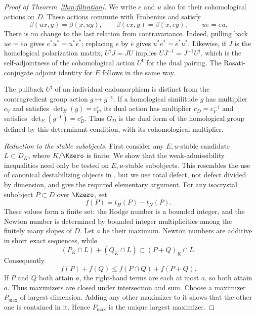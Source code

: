 \begin{proof}[Proof of Theorem~\ref{thm:filtration}]
We write $e$ and $u$ also for their cohomological actions on $D$.
These actions commute with Frobenius and satisfy
\begin{equation}
\label{eq:filtration-adjoints}
 \beta(ux,y)=\beta(x,uy),\qquad
 \beta(ex,y)=\beta(x,\bar e y),\qquad ue=\bar e u.
\end{equation}
There is no change to the last relation from contravariance.  Indeed,
pulling back $ue=\bar e u$ gives $e^*u^*=u^*\bar e^*$; replacing $e$
by $\bar e$ gives $u^*e^*=\bar e^*u^*$.  Likewise, if $J$ is the
homological polarization matrix, $U^{\mathsf t}J=JU$ implies
$UJ^{-1}=J^{-1}U^{\mathsf t}$, which is the self-adjointness of the
cohomological action $U^{\mathsf t}$ for the dual pairing.  The
Rosati-conjugate adjoint identity for $E$ follows in the same way.

The pullback $U^{\mathsf t}$ of an individual endomorphism is
distinct from the contragredient group action $g\mapsto g^{-\mathsf t}$.
If a homological similitude $g$ has multiplier $c_V$ and satisfies
$\det_E(g)=c_V^s$, its dual action has multiplier $c_D=c_V^{-1}$
and satisfies $\det_E(g^{-\mathsf t})=c_D^s$.
Thus $G_D$ is the dual form of the homological group defined by this
determinant condition, with its cohomological multiplier.

\medskip\noindent
\emph{Reduction to the stable subobjects.}
First consider any $E,u$-stable candidate $L\subset D_K$, where
$K/\Kzero$ is finite. We show that the weak-admissibility inequalities
need only be tested on $E,u$-stable subobjects. This resembles the use of canonical
destabilizing objects in \cite[Section~2]{FontaineRapoport2005},
but we use total defect, not defect divided by dimension, and give
the required elementary argument.
For any isocrystal subobject $P\subset D$ over $\Kzero$, set
\[
 f(P)=t_H(P)-t_N(P).
\]
These values form a finite set: the Hodge number is a bounded integer,
and the Newton number is determined by bounded integer multiplicities
among the finitely many slopes of $D$.  Let $a$ be their maximum.
Newton numbers are additive in short exact sequences, while
\[
 (P_K\cap L)+(Q_K\cap L)\subset (P+Q)_K\cap L.
\]
Consequently
\begin{equation}
\label{eq:filtration-supermodularity}
 f(P)+f(Q)\leq f(P\cap Q)+f(P+Q).
\end{equation}
If $P$ and $Q$ both attain $a$, the right-hand terms are each at
most $a$, so both attain $a$.  Thus maximizers are closed under
intersection and sum.  Choose a maximizer $P_{\max}$ of largest
dimension.  Adding any other maximizer to it shows that the other
one is contained in it.  Hence $P_{\max}$ is the unique largest
maximizer.


\end{proof}
